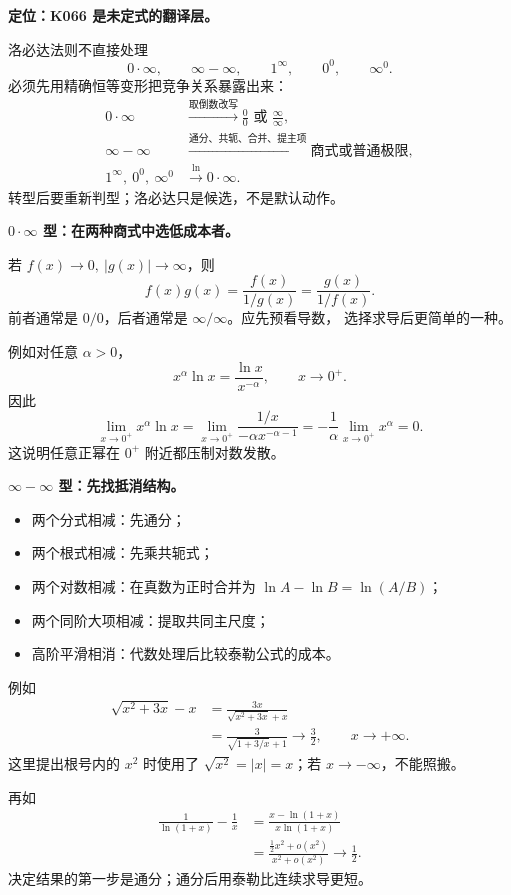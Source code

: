\begin{knowledgeBox}
\textbf{定位：K066 是未定式的翻译层。}

洛必达法则不直接处理
\[
0\cdot\infty,\qquad
\infty-\infty,\qquad
1^\infty,\qquad 0^0,\qquad \infty^0.
\]
必须先用精确恒等变形把竞争关系暴露出来：
\[
\boxed{
\begin{aligned}
0\cdot\infty
&\xrightarrow{\text{取倒数改写}}
\frac00\text{ 或 }\frac{\infty}{\infty},\\
\infty-\infty
&\xrightarrow{\text{通分、共轭、合并、提主项}}
\text{商式或普通极限},\\
1^\infty,\ 0^0,\ \infty^0
&\xrightarrow{\ln}
0\cdot\infty.
\end{aligned}}
\]
转型后要重新判型；洛必达只是候选，不是默认动作。

\textbf{\(0\cdot\infty\) 型：在两种商式中选低成本者。}

若 \(f(x)\to0,\ |g(x)|\to\infty\)，则
\[
f(x)g(x)
=\frac{f(x)}{1/g(x)}
=\frac{g(x)}{1/f(x)}.
\]
前者通常是 \(0/0\)，后者通常是 \(\infty/\infty\)。应先预看导数，
选择求导后更简单的一种。

例如对任意 \(\alpha>0\)，
\[
x^\alpha\ln x
=\frac{\ln x}{x^{-\alpha}},
\qquad x\to0^+.
\]
因此
\[
\lim_{x\to0^+}x^\alpha\ln x
=\lim_{x\to0^+}
\frac{1/x}{-\alpha x^{-\alpha-1}}
=-\frac1\alpha\lim_{x\to0^+}x^\alpha
=0.
\]
这说明任意正幂在 \(0^+\) 附近都压制对数发散。

\textbf{\(\infty-\infty\) 型：先找抵消结构。}

\begin{itemize}
  \item 两个分式相减：先通分；
  \item 两个根式相减：先乘共轭式；
  \item 两个对数相减：在真数为正时合并为
  \(\ln A-\ln B=\ln(A/B)\)；
  \item 两个同阶大项相减：提取共同主尺度；
  \item 高阶平滑相消：代数处理后比较泰勒公式的成本。
\end{itemize}

例如
\[
\begin{aligned}
\sqrt{x^2+3x}-x
&=\frac{3x}{\sqrt{x^2+3x}+x}\\
&=\frac3{\sqrt{1+3/x}+1}
\longrightarrow\frac32,
\qquad x\to+\infty.
\end{aligned}
\]
这里提出根号内的 \(x^2\) 时使用了
\(\sqrt{x^2}=|x|=x\)；若 \(x\to-\infty\)，不能照搬。

再如
\[
\begin{aligned}
\frac1{\ln(1+x)}-\frac1x
&=\frac{x-\ln(1+x)}{x\ln(1+x)}\\
&=\frac{\frac12x^2+o(x^2)}{x^2+o(x^2)}
\longrightarrow\frac12.
\end{aligned}
\]
决定结果的第一步是通分；通分后用泰勒比连续求导更短。


\end{knowledgeBox}
